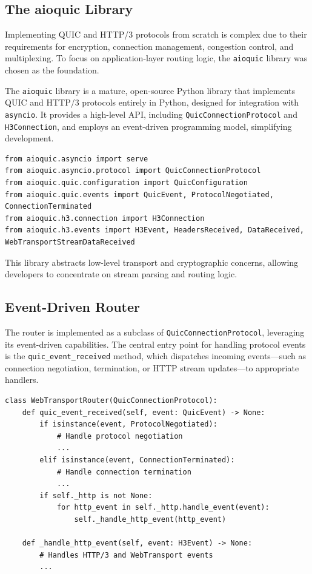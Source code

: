 \subsection{The aioquic Library}
Implementing QUIC and HTTP/3 protocols from scratch is complex due to their requirements for encryption, connection management, congestion control, and multiplexing. To focus on application-layer routing logic, the \texttt{aioquic} library was chosen as the foundation.

The \texttt{aioquic} library \cite{aioquic-repo} is a mature, open-source Python \cite{python-docs} library that implements QUIC and HTTP/3 protocols entirely in Python, designed for integration with \texttt{asyncio}. It provides a high-level API, including \texttt{QuicConnectionProtocol} and \texttt{H3Connection}, and employs an event-driven programming model, simplifying development.

\begin{lstlisting}
from aioquic.asyncio import serve
from aioquic.asyncio.protocol import QuicConnectionProtocol
from aioquic.quic.configuration import QuicConfiguration
from aioquic.quic.events import QuicEvent, ProtocolNegotiated, ConnectionTerminated
from aioquic.h3.connection import H3Connection
from aioquic.h3.events import H3Event, HeadersReceived, DataReceived, WebTransportStreamDataReceived
\end{lstlisting}

This library abstracts low-level transport and cryptographic concerns, allowing developers to concentrate on stream parsing and routing logic.

\subsection{Event-Driven Router}
The router is implemented as a subclass of \texttt{QuicConnectionProtocol}, leveraging its event-driven capabilities. The central entry point for handling protocol events is the \texttt{quic\_event\_received} method, which dispatches incoming events—such as connection negotiation, termination, or HTTP stream updates—to appropriate handlers.

\begin{lstlisting}
class WebTransportRouter(QuicConnectionProtocol):
    def quic_event_received(self, event: QuicEvent) -> None:
        if isinstance(event, ProtocolNegotiated):
            # Handle protocol negotiation
            ...
        elif isinstance(event, ConnectionTerminated):
            # Handle connection termination
            ...
        if self._http is not None:
            for http_event in self._http.handle_event(event):
                self._handle_http_event(http_event)

    def _handle_http_event(self, event: H3Event) -> None:
        # Handles HTTP/3 and WebTransport events
        ...
\end{lstlisting}

